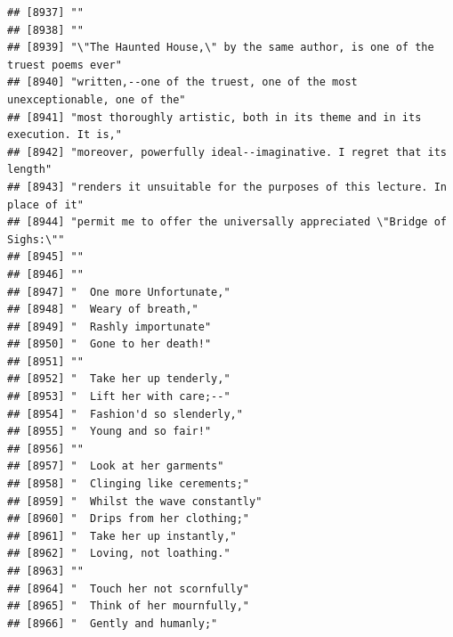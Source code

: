 \documentclass{article}\usepackage[]{graphicx}\usepackage[]{color}
\makeatletter
\newenvironment{kframe}{%
 \def\at@end@of@kframe{}%
 \ifinner\ifhmode%
  \def\at@end@of@kframe{\end{minipage}}%
  \begin{minipage}{\columnwidth}%
 \fi\fi%
 \def\FrameCommand##1{\hskip\@totalleftmargin \hskip-\fboxsep
 \colorbox{shadecolor}{##1}\hskip-\fboxsep
     \hskip-\linewidth \hskip-\@totalleftmargin \hskip\columnwidth}%
 \MakeFramed {\advance\hsize-\width
   \@totalleftmargin\z@ \linewidth\hsize
   \@setminipage}}%
 {\par\unskip\endMakeFramed%
 \at@end@of@kframe}
\newenvironment{knitrout}{}{} %
\makeatother
\begin{document}
\begin{knitrout}
\begin{kframe}
\begin{verbatim}
## [8937] ""                                                                            
## [8938] ""                                                                            
## [8939] "\"The Haunted House,\" by the same author, is one of the truest poems ever"  
## [8940] "written,--one of the truest, one of the most unexceptionable, one of the"    
## [8941] "most thoroughly artistic, both in its theme and in its execution. It is,"    
## [8942] "moreover, powerfully ideal--imaginative. I regret that its length"           
## [8943] "renders it unsuitable for the purposes of this lecture. In place of it"      
## [8944] "permit me to offer the universally appreciated \"Bridge of Sighs:\""         
## [8945] ""                                                                            
## [8946] ""                                                                            
## [8947] "  One more Unfortunate,"                                                     
## [8948] "  Weary of breath,"                                                          
## [8949] "  Rashly importunate"                                                        
## [8950] "  Gone to her death!"                                                        
## [8951] ""                                                                            
## [8952] "  Take her up tenderly,"                                                     
## [8953] "  Lift her with care;--"                                                     
## [8954] "  Fashion'd so slenderly,"                                                   
## [8955] "  Young and so fair!"                                                        
## [8956] ""                                                                            
## [8957] "  Look at her garments"                                                      
## [8958] "  Clinging like cerements;"                                                  
## [8959] "  Whilst the wave constantly"                                                
## [8960] "  Drips from her clothing;"                                                  
## [8961] "  Take her up instantly,"                                                    
## [8962] "  Loving, not loathing."                                                     
## [8963] ""                                                                            
## [8964] "  Touch her not scornfully"                                                  
## [8965] "  Think of her mournfully,"                                                  
## [8966] "  Gently and humanly;"                                                       

\end{verbatim}
\end{kframe}
\end{knitrout}
\end{document}
